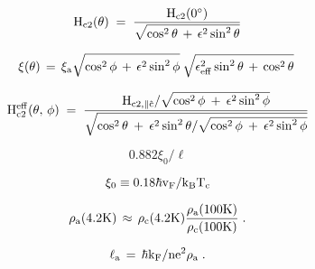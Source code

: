 {\newpage
\clearpage
\samepage \begin{equation}%
\label{ldtheor2}
\rm H_{c2}(\theta) \; = \; \frac{H_{c2}(0^{\circ})}{\sqrt{\cos^2\theta \,
+ \, \epsilon^2 \sin^2\theta}}
\end{equation}
}

{\newpage
\clearpage
\samepage \begin{figure}\vspace{15cm}

\label{fquant}
\end{figure}
}

{\newpage
\clearpage
\samepage \begin{figure}\vspace{18cm}

\label{xsection}
\end{figure}
}

{\newpage
\clearpage
\samepage \begin{displaymath}%
\rm  \xi(\theta) \, = \,  \xi_a
\sqrt{\cos^2 \phi \, + \,   \epsilon^2 \sin^2  \phi} \:  \sqrt{\epsilon_{eff}^2 \sin^2\theta \, +  \,
\cos^2 \theta} \;   
\end{displaymath}
}

{\newpage
\clearpage
\samepage \begin{equation}%
\label{tilthc21}
\rm H_{c2}^{eff}(\theta,\, \phi) \; = \; \frac{H_{c2, \parallel
\hat{c}}/\sqrt{\cos^2\phi \: + \: \epsilon^2\sin^2\phi}}{\sqrt{\cos^2\theta
\: + \: \epsilon^2\sin^2\theta / \sqrt{\cos^2\phi \: + \: \epsilon^2\sin^2\phi}}} 
\end{equation}
}

{\newpage
\clearpage
\samepage \begin{displaymath}0.882  \xi_0 / \ell \end{displaymath}
}

{\newpage
\clearpage
\samepage \begin{displaymath}\rm \xi_0 \equiv    0.18   \hbar  v_F  /   k_B   T_c   \end{displaymath}
}

{\newpage
\clearpage
\samepage \begin{displaymath}\rm \rho_a(4.2K) \, \approx \, \rho_c(4.2K) \frac{\rho_a(100K)}{\rho_c(100K)} \; .\end{displaymath}
}

{\newpage
\clearpage
\samepage \begin{displaymath}\rm \ell_a \,  = \, \hbar  k_F / n e^2 \rho_a \; . \end{displaymath}
}

